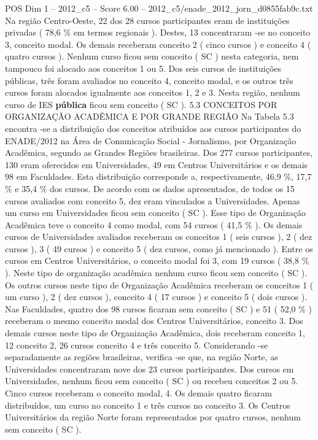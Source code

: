 \begin{textsample}{POS Dim 1 – 2012\_c5 – Score 6.00 – 2012\_c5/enade\_2012\_jorn\_d0855fab9c.txt}
Na região Centro-Oeste, 22 dos 28 cursos participantes eram de instituições privadas ( 78,6 \% em termos regionais ).
Destes, 13 concentraram -se no conceito 3, conceito modal.
Os demais receberam conceito 2 ( cinco cursos ) e conceito 4 ( quatro cursos ).
Nenhum curso ficou sem conceito ( SC ) nesta categoria, nem tampouco foi alocado aos conceitos 1 ou 5.
Dos seis cursos de instituições públicas, três foram avaliados no conceito 4, conceito modal, e os outros três cursos foram alocados igualmente aos conceitos 1, 2 e 3.
Nesta região, nenhum curso de IES \textbf{pública} ficou sem conceito ( SC ). 5.3 CONCEITOS POR ORGANIZAÇÃO ACADÊMICA E POR GRANDE REGIÃO Na Tabela 5.3 encontra -se a distribuição dos conceitos atribuídos aos cursos participantes do ENADE/2012 na Área de Comunicação Social - Jornalismo, por Organização Acadêmica, segundo as Grandes Regiões brasileiras.
Dos 277 cursos participantes, 130 eram oferecidos em Universidades, 49 em Centros Universitários e os demais 98 em Faculdades.
Esta distribuição corresponde a, respectivamente, 46,9 \%, 17,7 \% e 35,4 \% dos cursos.
De acordo com os dados apresentados, de todos os 15 cursos avaliados com conceito 5, dez eram vinculados a Universidades.
Apenas um curso em Universidades ficou sem conceito ( SC ).
Esse tipo de Organização Acadêmica teve o conceito 4 como modal, com 54 cursos ( 41,5 \% ).
Os demais cursos de Universidades avaliados receberam os conceitos 1 ( seis cursos ), 2 ( dez cursos ), 3 ( 49 cursos ) e conceito 5 ( dez cursos, como já mencionado ).
Entre os cursos em Centros Universitários, o conceito modal foi 3, com 19 cursos ( 38,8 \% ).
Neste tipo de organização acadêmica nenhum curso ficou sem conceito ( SC ).
Os outros cursos neste tipo de Organização Acadêmica receberam os conceitos 1 ( um curso ), 2 ( dez cursos ), conceito 4 ( 17 cursos ) e conceito 5 ( dois cursos ).
Nas Faculdades, quatro dos 98 cursos ficaram sem conceito ( SC ) e 51 ( 52,0 \% ) receberam o mesmo conceito modal dos Centros Universitários, conceito 3.
Dos demais cursos neste tipo de Organização Acadêmica, dois receberam conceito 1, 12 conceito 2, 26 cursos conceito 4 e três conceito 5.
Considerando -se separadamente as regiões brasileiras, verifica -se que, na região Norte, as Universidades concentraram nove dos 23 cursos participantes.
Dos cursos em Universidades, nenhum ficou sem conceito ( SC ) ou recebeu conceitos 2 ou 5.
Cinco cursos receberam o conceito modal, 4.
Os demais quatro ficaram distribuídos, um curso no conceito 1 e três cursos no conceito 3.
Os Centros Universitários da região Norte foram representados por quatro cursos, nenhum sem conceito ( SC ).

\end{textsample}

